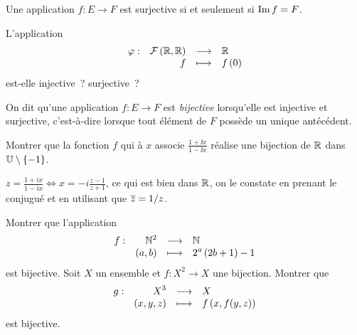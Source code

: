 \documentclass{magnoliaold}
\begin{document}
\begin{proposition}[utile=-3]
Une application $f:E\to F$ est surjective si et seulement si $\operatorname{Im} f=F$.
\end{proposition}

\begin{exos}
\exo L'application
  \[\begin{array}[t]{lrcl} \displaystyle{\varphi} : & \displaystyle{\mathcal{F}\left(\mathbb{R},\mathbb{R}\right)} & \longrightarrow & \displaystyle{\mathbb{R}} \\ & \displaystyle{f} & \longmapsto & \displaystyle{f\left(0\right)} \end{array}\]
  est-elle injective~? surjective~?
\end{exos}

\begin{definition}[utile=-3]
On dit qu'une application $f:E\to F$ est \emph{bijective} lorsqu'elle est injective et
surjective, c'est-à-dire lorsque tout élément de $F$ possède un unique antécédent.
\end{definition}

\begin{exos}
\exo Montrer que la fonction $f$ qui à $x$ associe $\frac{1+\ii x}{1-\ii x}$
  réalise une bijection de $\mathbb{R}$ dans $\U\setminus\ens{-1}$.
  \begin{sol}
  $\displaystyle z=\frac{1+ix}{1-ix}\Longleftrightarrow x=-i \frac{z-1}{z+1}$, ce qui est bien dans $\mathbb{R}$, on le constate en prenant le conjugué et en utilisant que $\overline{z}=1/z$.
  \end{sol}
\exo Montrer que l'application
  \[\begin{array}[t]{lrcl} \displaystyle{f} : & \displaystyle{\mathbb{N}^2} & \longrightarrow & \displaystyle{\mathbb{N}} \\ & \displaystyle{\left(a,b\right)} & \longmapsto & \displaystyle{2^a\left(2b+1\right)-1} \end{array}\]
  est bijective.
\exo Soit $X$ un ensemble et $f:X^2\to X$ une bijection. Montrer que
  \[\begin{array}[t]{lrcl} \displaystyle{g} : & \displaystyle{X^3} & \longrightarrow & \displaystyle{X} \\ & \displaystyle{(x,y,z)} & \longmapsto & \displaystyle{f\left(x,f(y,z)\right)} \end{array}\]
  est bijective.
\end{exos}


\end{document}
